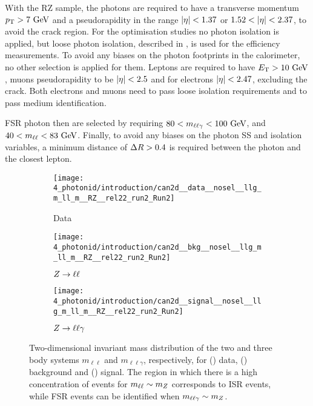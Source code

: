 With the \ac{RZ} sample, the photons are required to have a transverse momentum \(p_{\text{T}}>7~\text{GeV}\) and a pseudorapidity in the range \(|\eta|<1.37\) or \(1.52<\abseta<2.37\), to avoid the crack region.
For the optimisation studies no photon isolation is applied, but loose photon isolation, described in \Sect{\ref{subsec:objects:egamma:iso}}, is used for the efficiency measurements. To avoid any biases on the photon footprints in the calorimeter, no other selection is applied for them. Leptons are required to have \(E_{\text{T}}>10~\text{GeV}\), muons pseudorapidity to be \(|\eta|<2.5\) and for electrons \(|\eta|<2.47\), excluding the crack. Both electrons and muons need to pass loose isolation requirements and to pass medium identification.

\ac{FSR} photon then are selected by requiring \(80<m_{\ell\ell\gamma}<100~\text{GeV}\), and \(40<m_{\ell\ell}<83~\text{GeV}\). Finally, to avoid any biases on the photon \ac{SS} and isolation variables, a minimum distance of \(\Delta R>0.4\) is required between the photon and the closest lepton.

\begin{figure}[ht!]
    \centering
    \begin{subfigure}[h]{0.32\linewidth}
        \centering
        \texttt{[image: 4\_photonid/introduction/can2d\_\_data\_\_nosel\_\_llg\_m\_ll\_m\_\_RZ\_\_rel22\_run2\_Run2]}
        \caption{Data}
        \label{fig:pid_ss:event_selection:mll_mlly_distribution:data}
    \end{subfigure}
    \hfill
    \begin{subfigure}[h]{0.32\linewidth}
        \centering
        \texttt{[image: 4\_photonid/introduction/can2d\_\_bkg\_\_nosel\_\_llg\_m\_ll\_m\_\_RZ\_\_rel22\_run2\_Run2]}
        \caption{\(Z\rightarrow \ell\ell\)}
        \label{fig:pid_ss:event_selection:mll_mlly_distribution:bkg}
    \end{subfigure}
    \hfill
    \begin{subfigure}[h]{0.32\linewidth}
        \centering
        \texttt{[image: 4\_photonid/introduction/can2d\_\_signal\_\_nosel\_\_llg\_m\_ll\_m\_\_RZ\_\_rel22\_run2\_Run2]}
        \caption{\(Z\rightarrow \ell\ell\gamma\)}
        \label{fig:pid_ss:event_selection:mll_mlly_distribution:signal}
    \end{subfigure}
    \caption{Two-dimensional invariant mass distribution of the two and three body systems \(m_{\ell\ell}\) and \(m_{\ell\ell\gamma}\), respectively, for () data, () background and () signal. The region in which there is a high concentration of events for \(m_{\ell\ell} \sim m_{Z}\) corresponds to \ac{ISR} events, while \ac{FSR} events can be identified when \(m_{\ell\ell\gamma} \sim m_{Z}\).}
    \label{fig:pid_ss:event_selection:mll_mlly_distribution}
\end{figure}

